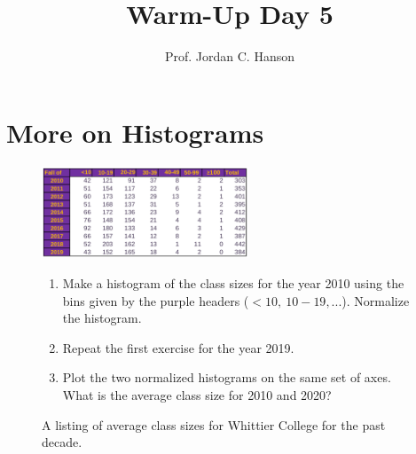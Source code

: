 \documentclass{article}
\begin{document}
\title{Warm-Up Day 5}
\author{Prof. Jordan C. Hanson}

\maketitle

\section{More on Histograms}

\begin{figure}[ht]
\centering
\includegraphics[width=0.55\textwidth]{class_size.png}
\caption{\label{fig:classsize} A listing of average class sizes for Whittier College for the past decade.}
\begin{enumerate}
\item Make a histogram of the class sizes for the year 2010 using the bins given by the purple headers ($<10,~10-19,...$). Normalize the histogram. \\ \vspace{3.5cm}
\item Repeat the first exercise for the year 2019. \\ \vspace{3.5cm}
\item Plot the two normalized histograms on the same set of axes.  What is the average class size for 2010 and 2020?
\end{enumerate}
\end{figure}
\end{document}
